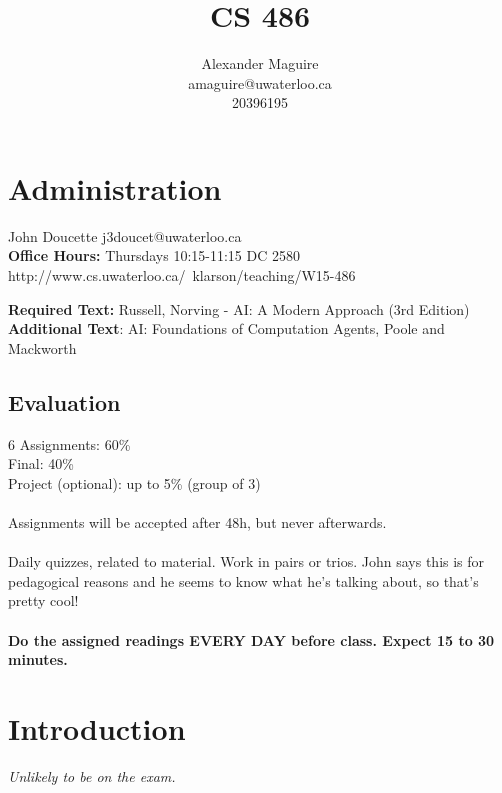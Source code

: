 \documentclass[12pt]{article}
\begin{document}
\renewcommand{\b}[1]{\textbf{#1}}
\newcommand{\insight}[1]{\b{Insight:} \textit{#1}}
\newcommand{\actionable}[1]{\todo{#1}}


\nocite{*}

\title{CS 486}

\author{Alexander Maguire \\
amaguire@uwaterloo.ca \\
20396195}

\maketitle

\section{Administration}
John Doucette j3doucet@uwaterloo.ca \\
\textbf{Office Hours:} Thursdays 10:15-11:15 DC 2580 \\
http://www.cs.uwaterloo.ca/~klarson/teaching/W15-486

\textbf{Required Text:} Russell, Norving - AI: A Modern Approach (3rd Edition) \\
\textbf{Additional Text}: AI: Foundations of Computation Agents, Poole and Mackworth

\subsection{Evaluation}
6 Assignments: 60\% \\
Final: 40\% \\
Project (optional): up to 5\% (group of 3) \\
\\
Assignments will be accepted after 48h, but never afterwards. \\
\\
Daily quizzes, related to material. Work in pairs or trios. John says this is for pedagogical reasons and he seems to
know what he's talking about, so that's pretty cool! \\
\\
\b{Do the assigned readings EVERY DAY before class. Expect 15 to 30 minutes.}




\section{Introduction}
\textit{Unlikely to be on the exam.}
\end{document}

